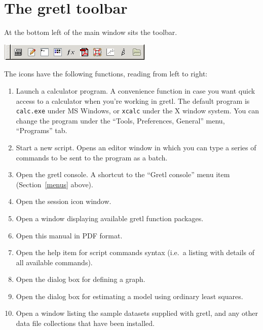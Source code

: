 \section{The gretl toolbar}
\label{toolbar}

At the bottom left of the main window sits the toolbar.

\begin{center}
  \includegraphics[scale=0.75]{figures/toolbar}
\end{center}

The icons have the following functions, reading from left to right:

\begin{enumerate}
\item Launch a calculator program.  A convenience function in case you
  want quick access to a calculator when you're working in
  gretl.  The default program is \verb+calc.exe+ under MS
  Windows, or \verb+xcalc+ under the X window system.  You can change
  the program under the ``Tools, Preferences, General'' menu,
  ``Programs'' tab.
\item Start a new script.  Opens an editor window in which you can
  type a series of commands to be sent to the program as a batch.
\item Open the gretl console.  A shortcut to the ``Gretl console''
  menu item (Section~\ref{menus} above).
\item Open the session icon window.
\item Open a window displaying available gretl function packages.
\item Open this manual in PDF format.
\item Open the help item for script commands syntax (i.e.\ a listing
  with details of all available commands).
\item Open the dialog box for defining a graph.
\item Open the dialog box for estimating a model using ordinary least
  squares.
\item Open a window listing the sample datasets supplied with
  gretl, and any other data file collections that have been
  installed.
\end{enumerate}



